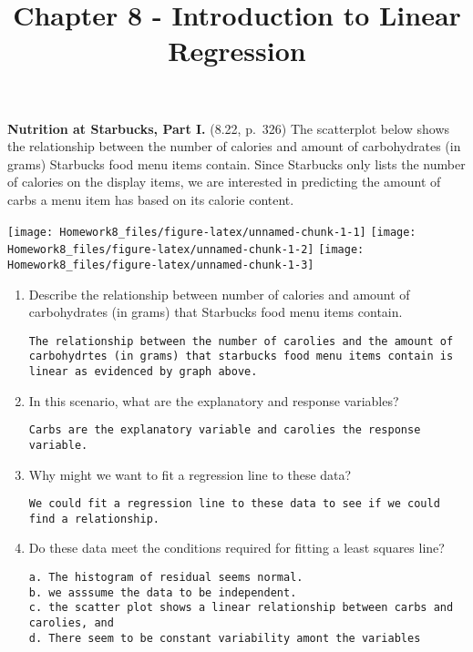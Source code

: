 \documentclass[]{article}
\title{Chapter 8 - Introduction to Linear Regression}
\author{}
\date{}
\begin{document}
\maketitle

\textbf{Nutrition at Starbucks, Part I.} (8.22, p.~326) The scatterplot
below shows the relationship between the number of calories and amount
of carbohydrates (in grams) Starbucks food menu items contain. Since
Starbucks only lists the number of calories on the display items, we are
interested in predicting the amount of carbs a menu item has based on
its calorie content.

\texttt{[image: Homework8\_files/figure-latex/unnamed-chunk-1-1]}
\texttt{[image: Homework8\_files/figure-latex/unnamed-chunk-1-2]}
\texttt{[image: Homework8\_files/figure-latex/unnamed-chunk-1-3]}

\begin{enumerate}
\def\labelenumi{(\alph{enumi})}
\item
  Describe the relationship between number of calories and amount of
  carbohydrates (in grams) that Starbucks food menu items contain.

\begin{verbatim}
The relationship between the number of carolies and the amount of carbohydrtes (in grams) that starbucks food menu items contain is linear as evidenced by graph above.
\end{verbatim}
\item
  In this scenario, what are the explanatory and response variables?

\begin{verbatim}
Carbs are the explanatory variable and carolies the response variable.
\end{verbatim}
\item
  Why might we want to fit a regression line to these data?

\begin{verbatim}
We could fit a regression line to these data to see if we could find a relationship.
\end{verbatim}
\item
  Do these data meet the conditions required for fitting a least squares
  line?

\begin{verbatim}
a. The histogram of residual seems normal.
b. we asssume the data to be independent.
c. the scatter plot shows a linear relationship between carbs and carolies, and 
d. There seem to be constant variability amont the variables
\end{verbatim}
\end{enumerate}
\end{document}
